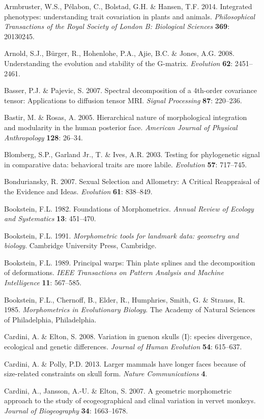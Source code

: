 \documentclass[12pt,twoside]{report}
\begin{document}
Armbruster, W.S., Pélabon, C., Bolstad, G.H. \& Hansen, T.F. 2014.
Integrated phenotypes: understanding trait covariation in plants and
animals. \emph{Philosophical Transactions of the Royal Society of London
B: Biological Sciences} \textbf{369}: 20130245.

Arnold, S.J., Bürger, R., Hohenlohe, P.A., Ajie, B.C. \& Jones, A.G.
2008. Understanding the evolution and stability of the G-matrix.
\emph{Evolution} \textbf{62}: 2451--2461.

Basser, P.J. \& Pajevic, S. 2007. Spectral decomposition of a 4th-order
covariance tensor: Applications to diffusion tensor MRI. \emph{Signal
Processing} \textbf{87}: 220--236.

Bastir, M. \& Rosas, A. 2005. Hierarchical nature of morphological
integration and modularity in the human posterior face. \emph{American
Journal of Physical Anthropology} \textbf{128}: 26--34.

Blomberg, S.P., Garland Jr., T. \& Ives, A.R. 2003. Testing for
phylogenetic signal in comparative data: behavioral traits are more
labile. \emph{Evolution} \textbf{57}: 717--745.

Bonduriansky, R. 2007. Sexual Selection and Allometry: A Critical
Reappraisal of the Evidence and Ideas. \emph{Evolution} \textbf{61}:
838--849.

Bookstein, F.L. 1982. Foundations of Morphometrics. \emph{Annual Review
of Ecology and Systematics} \textbf{13}: 451--470.

Bookstein, F.L. 1991. \emph{Morphometric tools for landmark data:
geometry and biology}. Cambridge University Press, Cambridge.

Bookstein, F.L. 1989. Principal warps: Thin plate splines and the
decomposition of deformations. \emph{IEEE Transactions on Pattern
Analysis and Machine Intelligence} \textbf{11}: 567--585.

Bookstein, F.L., Chernoff, B., Elder, R., Humphries, Smith, G. \&
Strauss, R. 1985. \emph{Morphometrics in Evolutionary Biology}. The
Academy of Natural Sciences of Philadelphia, Philadelphia.

Cardini, A. \& Elton, S. 2008. Variation in guenon skulls (I): species
divergence, ecological and genetic differences. \emph{Journal of Human
Evolution} \textbf{54}: 615--637.

Cardini, A. \& Polly, P.D. 2013. Larger mammals have longer faces
because of size-related constraints on skull form. \emph{Nature
Communications} \textbf{4}.

Cardini, A., Jansson, A.-U. \& Elton, S. 2007. A geometric morphometric
approach to the study of ecogeographical and clinal variation in vervet
monkeys. \emph{Journal of Biogeography} \textbf{34}: 1663--1678.
\end{document}
